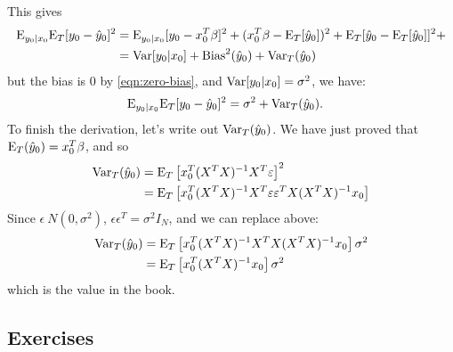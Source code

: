 This gives
\begin{align*}
  \mathrm{E}_{y_0 | x_0}\mathrm{E}_{T}[y_0 - \hat{y}_0]^2 &= \mathrm{E}_{y_0|x_0} [y_0 - x_0^T \beta]^2 + (x_0^T\beta - \mathrm{E}_{T}[\hat{y}_0])^2 + \mathrm{E}_{T}[\hat{y}_0 - \mathrm{E}_{T}[\hat{y}_0]]^2 +\\
                                           &= \mathrm{Var}[y_0 | x_0] + \mathrm{Bias}^2(\hat{y}_0) + \mathrm{Var}_T(\hat{y}_0)
\end{align*}
but the bias is $0$ by \eqref{eqn:zero-bias}, and $\mathrm{Var}[y_0 | x_0] = \sigma^2$, we have:
\begin{align*}
  \mathrm{E}_{y_0 | x_0}\mathrm{E}_{T}[y_0 - \hat{y}_0]^2 &= \sigma^2 + \mathrm{Var}_{T}(\hat{y}_0).
\end{align*}
To finish the derivation, let's write out $\mathrm{Var}_{T}(\hat{y}_0)$. We have just proved that $\mathrm{E}_{T}(\hat{y}_0) = x_0^T\beta$, and so
\begin{align*}
  \mathrm{Var}_{T}(\hat{y}_0) &= \mathrm{E}_{T}\left[x_0^T(X^T X)^{-1} X^T \varepsilon\right]^2\\
                    &= \mathrm{E}_{T}\left[x_0^T(X^T X)^{-1} X^T \varepsilon\varepsilon^T X (X^T X)^{-1} x_0\right]
\end{align*}
Since $\epsilon ~ N(0, \sigma^2)$, $\epsilon\epsilon^T = \sigma^2 I_N$, and we can replace above:
\begin{align*}
  \mathrm{Var}_{T}(\hat{y}_0) &= \mathrm{E}_{T}\left[x_0^T(X^T X)^{-1} X^T X (X^T X)^{-1} x_0\right]\sigma^2\\
                    &= \mathrm{E}_{T}\left[x_0^T (X^T X)^{-1} x_0\right]\sigma^2
\end{align*}
which is the value in the book.

\subsection*{Exercises}
